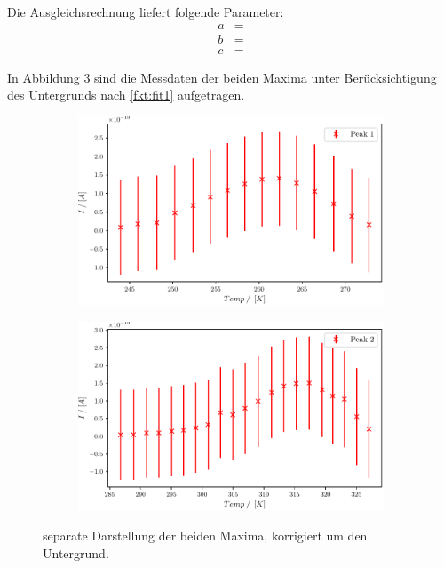 Die Ausgleichsrechnung liefert folgende Parameter:
\begin{align}
  a &=  \\
  b &=  \\
  c &= 
\end{align}

In Abbildung \ref{fig:Auswertung_5_6} sind die Messdaten der beiden Maxima unter Berücksichtigung des Untergrunds nach \ref{fkt:fit1} aufgetragen.


\begin{figure}
\centering
\begin{subfigure}{.5\textwidth}
	\centering
	\includegraphics[width=1\textwidth]{build/1_Temp_current_peak.pdf}
	\caption{}
	\label{fig:Auswertung_5}
\end{subfigure}%
\begin{subfigure}{.5\textwidth}
	\centering
	\includegraphics[width=1\textwidth]{build/1_Temp_current_peak2.pdf}
	\caption{}
	\label{fig:Auswertung_6}
\end{subfigure}
\caption{separate Darstellung der beiden Maxima, korrigiert um den Untergrund.}
\label{fig:Auswertung_5_6}
\end{figure}

